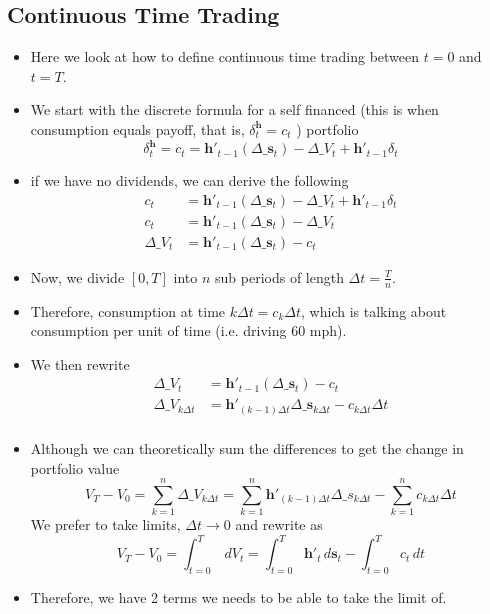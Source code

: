 \documentclass[11pt]{article}
\begin{document}
\subsection{Continuous Time Trading}
\begin{itemize}
    \item Here we look at how to define continuous time trading between $t=0$ and $t=T$.
    \item We start with the discrete formula for a self financed (this is when consumption 
    equals payoff, that is, $\delta_t^{\boldsymbol{h}} = c_t$ ) portfolio
    \[ \delta_t^{\boldsymbol{h}} = c_t = \boldsymbol{h}'_{t-1}(\Delta\_\boldsymbol{s}_t) - 
    \Delta \_ V_t + \boldsymbol{h}'_{t-1} \delta_t \]
    \item if we have no dividends, we can derive the following
    \begin{align*}
        c_t &= \boldsymbol{h}'_{t-1}(\Delta\_\boldsymbol{s}_t) - \Delta \_ V_t + 
        \boldsymbol{h}'_{t-1} \delta_t \\
        c_t &= \boldsymbol{h}'_{t-1}(\Delta\_\boldsymbol{s}_t) - \Delta \_ V_t \\
        \Delta \_ V_t &= \boldsymbol{h}'_{t-1}(\Delta\_\boldsymbol{s}_t) - c_t
    \end{align*}
    \item Now, we divide $[0,T]$ into $n$ sub periods of length $\Delta t = \frac{T}{n}$.
    \item Therefore, consumption at time $k \Delta t =  c_k \Delta t$, which is talking about 
    consumption per unit of time (i.e. driving 60 mph).
    \item We then rewrite
    \begin{align*}
        \Delta \_ V_t &= \boldsymbol{h}'_{t-1}(\Delta\_\boldsymbol{s}_t) - c_t \\
        \Delta \_ V_{k \Delta t} &= \boldsymbol{h}'_{(k-1)\Delta t}\Delta\_
        \boldsymbol{s}_{k \Delta t} - c_{k \Delta t} \Delta t \\
    \end{align*}
    \item Although we can theoretically sum the differences to get the change in portfolio 
    value 
    \[ 
    V_T - V_0 = \sum_{k=1}^{n}\Delta \_ V_{k\Delta t}
    = \sum_{k=1}^{n}\boldsymbol{h}'_{(k-1)\Delta t} \Delta \_ s_{k \Delta t} - 
    \sum_{k=1}^{n} c_{k \Delta t} \Delta t
    \]
    We prefer to take limits, $\Delta t \rightarrow 0$ and rewrite as 
    \[
    V_T - V_0 = \int_{t=0}^{T}\, dV_t 
    = \int_{t=0}^{T}\boldsymbol{h}'_t \, d\boldsymbol{s}_t - \int_{t=0}^{T} c_t \, dt
    \]
    \item Therefore, we have 2 terms we needs to be able to take the limit of.
\end{itemize}
\end{document}
